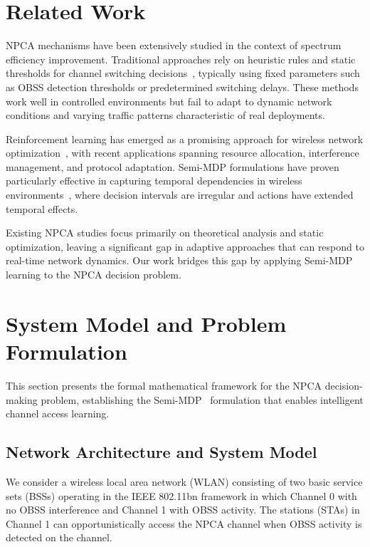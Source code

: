 \documentclass[conference]{IEEEtran}
\begin{document}
\section{Related Work}

NPCA mechanisms have been extensively studied in the context of spectrum efficiency improvement. Traditional approaches rely on heuristic rules and static thresholds for channel switching decisions~\cite{wei2024optimized}, typically using fixed parameters such as OBSS detection thresholds or predetermined switching delays. These methods work well in controlled environments but fail to adapt to dynamic network conditions and varying traffic patterns characteristic of real deployments.

Reinforcement learning has emerged as a promising approach for wireless network optimization~\cite{mnih2013playing}, with recent applications spanning resource allocation, interference management, and protocol adaptation. Semi-MDP formulations have proven particularly effective in capturing temporal dependencies in wireless environments~\cite{sutton2018reinforcement}, where decision intervals are irregular and actions have extended temporal effects.

Existing NPCA studies focus primarily on theoretical analysis and static optimization, leaving a significant gap in adaptive approaches that can respond to real-time network dynamics. Our work bridges this gap by applying Semi-MDP learning to the NPCA decision problem.

\section{System Model and Problem Formulation}

This section presents the formal mathematical framework for the NPCA decision-making problem, establishing the Semi-MDP~\cite{sutton1999between} formulation that enables intelligent channel access learning.

\subsection{Network Architecture and System Model}

We consider a wireless local area network (WLAN) consisting of two basic service sets (BSSs) operating in the IEEE 802.11bn framework in which Channel 0 with no OBSS interference and Channel 1 with OBSS activity. The stations (STAs) in Channel 1 can opportunistically access the NPCA channel when OBSS activity is detected on the channel.
\end{document}
